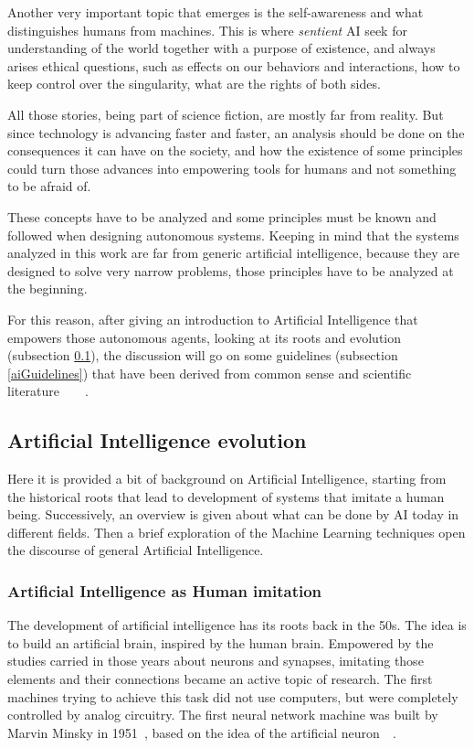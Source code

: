 Another very important topic that emerges is the self-awareness and what distinguishes humans from machines. This is where \textit{sentient} AI seek for understanding of the world together with a purpose of existence, and always arises ethical questions, such as effects on our behaviors and interactions, how to keep control over the singularity, what are the rights of both sides.

All those stories, being part of science fiction, are mostly far from reality. But since technology is advancing faster and faster, an analysis should be done on the consequences it can have on the society, and how the existence of some principles could turn those advances into empowering tools for humans and not something to be afraid of.

These concepts have to be analyzed and some principles must be known and followed when designing autonomous systems. Keeping in mind that the systems analyzed in this work are far from generic artificial intelligence, because they are designed to solve very narrow problems, those principles have to be analyzed at the beginning.

For this reason, after giving an introduction to Artificial Intelligence that empowers those autonomous agents, looking at its roots and evolution (subsection \ref{aiEvolution}), the discussion will go on some guidelines (subsection \ref{aiGuidelines}) that have been derived from common sense and scientific literature~\cite{walsh2016turing}~\cite{hibbard2014ethical}~\cite{moor2009four}~\cite{clarke2011asimov}.

\subsection{Artificial Intelligence evolution}
\label{aiEvolution}

Here it is provided a bit of background on Artificial Intelligence, starting from the historical roots that lead to development of systems that imitate a human being. Successively, an overview is given about what can be done by AI today in different fields. Then a brief exploration of the Machine Learning techniques open the discourse of general Artificial Intelligence.

\subsubsection{Artificial Intelligence as Human imitation}
The development of artificial intelligence has its roots back in the 50s. The idea is to build an artificial brain, inspired by the human brain. Empowered by the studies carried in those years about neurons and synapses, imitating those elements and their connections became an active topic of research. The first machines trying to achieve this task did not use computers, but were completely controlled by analog circuitry. The first neural network machine was built by Marvin Minsky in 1951~\cite{minsky1952neural}, based on the idea of the artificial neuron~\cite{mcculloch1943logical}~\cite{rosenblatt1958perceptron}.

